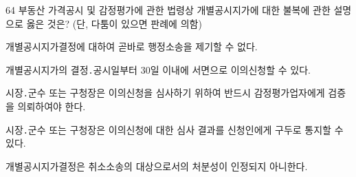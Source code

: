 \begin{question}{64}
부동산 가격공시 및 감정평가에 관한 법령상 개별공시지가에 대한 불복에 관한 설명으로 옳은 것은? (단, 다툼이 있으면 판례에 의함)
\begin{choices}
  \item 개별공시지가결정에 대하여 곧바로 행정소송을 제기할 수 없다.
  \item 개별공시지가의 결정․공시일부터 30일 이내에 서면으로 이의신청할 수 있다.
  \item 시장․군수 또는 구청장은 이의신청을 심사하기 위하여 반드시 감정평가업자에게 검증을 의뢰하여야 한다.
  \item 시장․군수 또는 구청장은 이의신청에 대한 심사 결과를 신청인에게 구두로 통지할 수 있다.
  \item 개별공시지가결정은 취소소송의 대상으로서의 처분성이 인정되지 아니한다.
\end{choices}
\end{question}
